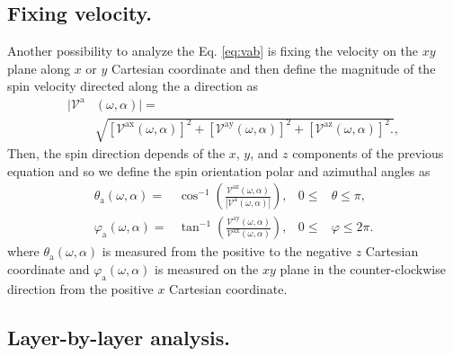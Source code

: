 \documentclass[prb,11pt,tightenlines,twocolumn,aps]{revtex4-1}
\begin{document}


\subsection{Fixing velocity.}\label{sec:theory-fixvel}

{\color{red} Another possibility to analyze the Eq. \eqref{eq:vab} is fixing the velocity on
the $xy$ plane along $x$ or $y$ Cartesian coordinate and then define the
magnitude of the spin velocity directed along the $\mathrm{a}$ direction as}
\begin{align}
|\mathcal{V}^{\mathrm{a}}&(\omega,\alpha)| = \nonumber \\
&\sqrt { 
[\mathcal{V}^{\mathrm{ax}}(\omega,\alpha)]^{2} +
[\mathcal{V}^{\mathrm{ay}}(\omega,\alpha)]^{2} +
[\mathcal{V}^{\mathrm{az}}(\omega,\alpha)]^{2} .
},
\label{eq:vv-mag}
\end{align}
{\color{red} Then, the spin direction depends of the $x$, $y$, and $z$
components of the previous equation and so we define the spin orientation polar
and azimuthal angles as}
\begin{align}
\theta_{\mathrm{a}}  (\omega,\alpha)
=& 
\cos^{-1} \left( \frac{\mathcal{V}^{\mathrm{az}}(\omega,\alpha)}
{|\mathcal{V}^{\mathrm{a}}(\omega,\alpha)|} \right),
& 0 \leq &\theta \leq \pi, 
\label{eq:polar-ang}
\\
\varphi_{\mathrm{a}} (\omega,\alpha)
=& 
\tan^{-1} \left( \frac{\mathcal{V}^{\mathrm{ay}}(\omega,\alpha)}
{\mathcal{V}^{\mathrm{ax}}(\omega,\alpha)} \right),
& 0 \leq &\varphi \leq 2\pi.
\label{eq:azimuthal-ang} 
\end{align}
{\color{red} where $\theta_{\mathrm{a}}(\omega,\alpha)$ is measured from the
positive to the negative $z$ Cartesian coordinate and
$\varphi_{\mathrm{a}}(\omega,\alpha)$ is measured on the $xy$ plane in the
counter-clockwise direction from the positive $x$ Cartesian coordinate.}




\subsection{Layer-by-layer analysis.}\label{sec:theory-layer}
\end{document}
